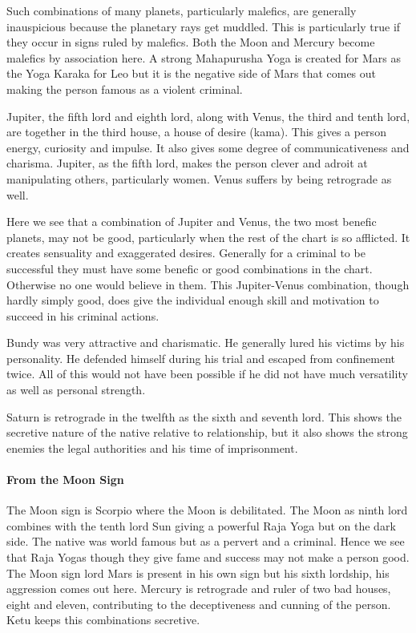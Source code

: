  

Such combinations of many planets, particularly malefics, are generally inauspicious because the planetary rays get muddled. This is particularly true if they occur in signs ruled by malefics. Both the Moon and Mercury become malefics by association here. A strong Mahapurusha Yoga is created for Mars as the Yoga Karaka for Leo but it is the negative side of Mars that comes out making the person famous as a violent criminal.

 

Jupiter, the fifth lord and eighth lord, along with Venus, the third and tenth lord, are together in the third house, a house of desire (kama). This gives a person energy, curiosity and impulse. It also gives some degree of communicativeness and charisma. Jupiter, as the fifth lord, makes the person clever and adroit at manipulating others, particularly women. Venus suffers by being retrograde as well.

 

Here we see that a combination of Jupiter and Venus, the two most benefic planets, may not be good, particularly when the rest of the chart is so afflicted. It creates sensuality and exaggerated desires. Generally for a criminal to be successful they must have some benefic or good combinations in the chart. Otherwise no one would believe in them. This Jupiter-Venus combination, though hardly simply good, does give the individual enough skill and motivation to succeed in his criminal actions.

 

Bundy was very attractive and charismatic. He generally lured his victims by his personality. He defended himself during his trial and escaped from confinement twice. All of this would not have been possible if he did not have much versatility as well as personal strength.

 

Saturn is retrograde in the twelfth as the sixth and seventh lord. This shows the secretive nature of the native relative to relationship, but it also shows the strong enemies the legal authorities and his time of imprisonment.

 

\paragraph{From the Moon Sign}

 

The Moon sign is Scorpio where the Moon is debilitated. The Moon as ninth lord combines with the tenth lord Sun giving a powerful Raja Yoga but on the dark side. The native was world famous but as a pervert and a criminal. Hence we see that Raja Yogas though they give fame and success may not make a person good. The Moon sign lord Mars is present in his own sign but his sixth lordship, his aggression comes out here. Mercury is retrograde and ruler of two bad houses, eight and eleven, contributing to the deceptiveness and cunning of the person. Ketu keeps this combinations secretive.

